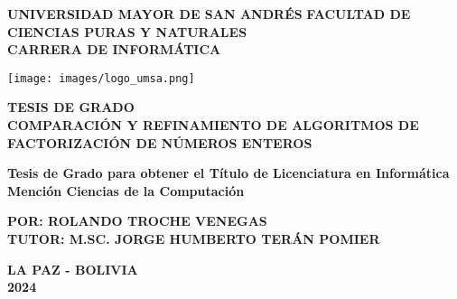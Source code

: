 \begin{titlepage} %
	\begin{center}
	    {\fontsize{20}{20}\selectfont \textbf{UNIVERSIDAD MAYOR DE SAN ANDRÉS}}
		{\fontsize{16}{16}\selectfont \textbf{FACULTAD DE CIENCIAS PURAS Y NATURALES\\
		CARRERA DE INFORMÁTICA}}
		
		\texttt{[image: images/logo\_umsa.png]}
		
		{\fontsize{16}{20}\selectfont \textbf{TESIS DE GRADO}}\\
		
        {\fontsize{16}{18}\selectfont \textbf{COMPARACIÓN Y REFINAMIENTO DE ALGORITMOS DE FACTORIZACIÓN DE NÚMEROS ENTEROS}}
		
		{\fontsize{12}{12}\selectfont\textbf{Tesis de Grado para obtener el Título de Licenciatura en Informática Mención Ciencias de la Computación}}
		
		{\fontsize{16}{16}\selectfont\textbf{POR: ROLANDO TROCHE VENEGAS}}\\
    	{\fontsize{14}{14}\selectfont\textbf{TUTOR: M.SC. JORGE HUMBERTO TERÁN POMIER}}
		 
		\textbf{LA PAZ - BOLIVIA\\
		2024}
	\end{center}
\end{titlepage}
\restoregeometry